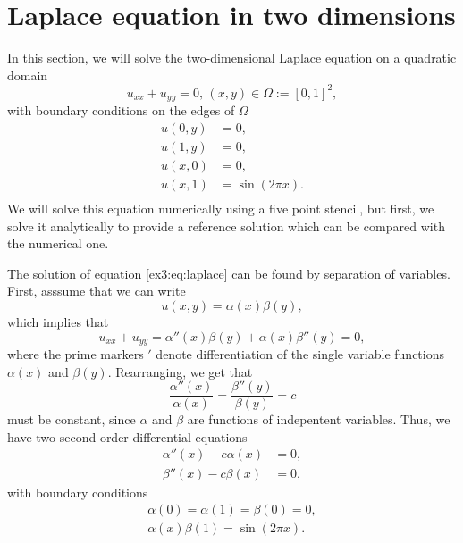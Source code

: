 \section{Laplace equation in two dimensions}
In this section, we will solve the two-dimensional Laplace equation on a quadratic domain
\begin{equation}
    u_{xx} + u_{yy} = 0, \, (x,y) \in \Omega := [0,1]^2,
    \label{ex3:eq:laplace}
\end{equation} with boundary conditions on the edges of $\Omega$
\begin{equation*}
    \begin{split}
        u(0,y) &= 0,\\
        u(1,y) &= 0,\\
        u(x,0) &= 0,\\
        u(x,1) &= \sin(2\pi x).\\
    \end{split}
\end{equation*}
We will solve this equation numerically using a five point stencil, but first, we solve it analytically to provide a reference solution which can be compared with the numerical one.

The solution of equation \ref{ex3:eq:laplace} can be found by separation of variables.
First, asssume that we can write
\begin{equation*}
    u(x,y) = \alpha(x) \beta(y),
\end{equation*}
which implies that
\begin{equation*}
    u_{xx} + u_{yy} =  \alpha''(x) \beta(y) + \alpha(x) \beta''(y) = 0,
\end{equation*}
where the prime markers $'$ denote differentiation of the single variable functions $\alpha(x)$ and $\beta(y)$.
Rearranging, we get that
\begin{equation*}
    \frac{\alpha''(x)}{\alpha(x)} = \frac{\beta''(y)}{\beta(y)} = c
\end{equation*}
must be constant, since $\alpha$ and $\beta$ are functions of indepentent variables.
Thus, we have two second order differential equations
\begin{equation*}
    \begin{split}
        \alpha''(x) - c\alpha(x) &= 0, \\
        \beta''(x) - c\beta(x) &= 0,
    \end{split}
\end{equation*}
with boundary conditions
\begin{equation*}
    \begin{split}
    \alpha(0) = \alpha(1) = \beta(0) = 0,\\
    \alpha(x)\beta(1) = \sin(2\pi x).
    \end{split}
\end{equation*}

